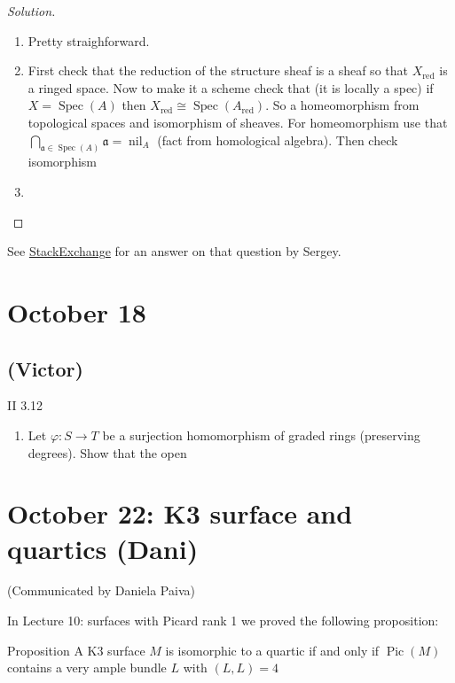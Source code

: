 \begin{proof}[Solution]\leavevmode
	\begin{enumerate}
		\item Pretty straighforward.

		\item First check that the reduction of the structure sheaf is a sheaf  so that $X_{\operatorname{red}}$ is a ringed space. Now to make it a scheme check that (it is locally a spec) if  $X=\operatorname{Spec}(A)$ then $X_{\operatorname{red}}\cong \operatorname{Spec}(A_{\operatorname{red}})$. So a homeomorphism from topological spaces and isomorphism of sheaves. For homeomorphism use that $\bigcap_{\mathfrak{a}\in\operatorname{Spec}(A)} \mathfrak{a}=\operatorname{nil}_A$ (fact from homological algebra). Then check isomorphism
	
		\item 
	\end{enumerate}
\end{proof}

See \href{https://math.stackexchange.com/questions/4158529/computing-the-image-of-a-projective-variety}{StackExchange} for an answer on that question by Sergey.

\section{October 18}

\subsection{(Victor)}

\begin{thing3}{II 3.12}\leavevmode
	\begin{enumerate}[label=\alph*.]
		\item Let $\varphi:S\to T$ be a surjection homomorphism of graded rings (preserving degrees). Show that the open 
	\end{enumerate}
\end{thing3}

\section{October 22: K3 surface and quartics (Dani)}

(Communicated by Daniela Paiva)

\vspace{1em}
In Lecture 10: surfaces with Picard rank 1 we proved the following proposition:
\begin{thing5}{Proposition}\leavevmode
	A K3 surface $M$ is isomorphic to a quartic if and only if $\operatorname{Pic}(M)$ contains a very ample bundle $L$ with $(L,L)=4$
\end{thing5}

